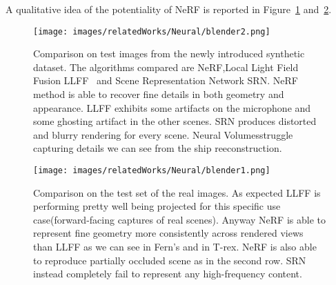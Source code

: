 A qualitative idea of the potentiality of NeRF is reported in Figure~\ref{fig:blender2} and~\ref{fig:blender1}.
\begin{figure}[H]
    \centering
    \texttt{[image: images/relatedWorks/Neural/blender2.png]} 
    \caption{Comparison on test images from the newly introduced
    synthetic dataset. The algorithms compared are NeRF,Local Light Field Fusion LLFF~\cite{} and Scene
    Representation Network SRN. NeRF method is able to recover fine details in both geometry
    and appearance. LLFF exhibits some artifacts on the microphone and some ghosting
    artifact in the other scenes. SRN produces distorted and blurry rendering for every
    scene. Neural Volumesstruggle capturing details we can see from
    the ship reeconstruction.}\label{fig:blender2}
\end{figure}

\begin{figure}[H]
    \centering
    \texttt{[image: images/relatedWorks/Neural/blender1.png]} 
    \caption{Comparison on the test set of the real images.
    As expected LLFF is performing pretty well being projected
    for this specific use case(forward-facing captures of real scenes).
    Anyway NeRF is able to represent fine geometry more consistently across
    rendered views than LLFF as we can see in Fern's and in T-rex. NeRF
    is also able to reproduce partially occluded scene as in the second row.
    SRN instead completely fail to represent any high-frequency content.}\label{fig:blender1}
\end{figure}
%
%
